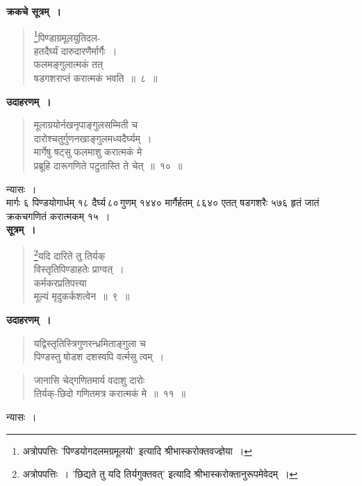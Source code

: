 \documentclass[11pt, openany]{book}
\begin{document}
\textbf{क्रकचे सूत्रम्~।}
\begin{quote}
{\gk \renewcommand{\thefootnote}{१}\footnote{अत्रोपपत्तिः
{\qt 'पिण्डयोगदलमग्रमूलयो'} इत्यादि {\qt श्रीभास्करो}क्तवज्ज्ञेया~।}पिण्डाग्रमूलयुतिदल-\\
हतदैर्घ्यं दारुदारणैर्मार्गैः~।\\
फलमङ्गुलात्मकं तत्\\
षडगशराप्तं करात्मकं भवति~॥~८~॥}
\end{quote}

\newpage

\textbf{उदाहरणम्~।}

\begin{quote}
{\ex मूलाग्रयोर्नखनृपाङ्गुलसम्मिती च\\
दारोश्चतुर्गुणनखाङ्गुलमध्यदैर्घ्यम्~।\\
मार्गेषु षट्सु फलमाशु करात्मकं मे\\
प्रब्रूहि दारूगणिते पटुतास्ति ते चेत्~॥~१०~॥}
\end{quote}

न्यासः~।\\

मार्गः ६ पिण्डयोगार्धम् १८ दैर्घ्य\textendash \,८०\textendash \,गुणम् १४४० मार्गैर्हतम् ८६४० एतत् षडगशरैः ५७६ हृतं जातं क्रकचगणितं करात्मकम् १५~।\\

\textbf{सूत्रम्~।}
\begin{quote}
{\gk \renewcommand{\thefootnote}{१}\footnote{अत्रोपपत्तिः~। {\qt 'छिद्यते तु यदि तिर्यगुक्तवत्'} इत्यादि {\qt श्रीभास्करो}क्तानुरूपमेवेदम्~।}यदि दारिते तु तिर्यक्\\
विस्तृतिपिण्डाहतेः प्राग्वत्~।\\
कर्मकरप्रतिपत्त्या\\
मूल्यं मृदुकर्कशत्वेन~॥~९~॥}
\end{quote}

\textbf{उदाहरणम्~।}

\begin{quote}
{\ex यद्विस्तृतिस्त्रिगुणरन्ध्रमिताङ्गुला च\\
पिण्डस्तु षोडश दशस्वपि वर्त्मसु त्वम्~।}
\end{quote}

\newpage

\begin{quote}
{\ex जानासि चेद्गणितमार्य वदाशु दारोः\\
	तिर्यक्-छिदो गणितमत्र करात्मकं मे~॥~११~॥}	
\end{quote}

न्यासः~।\\
\vspace{-3mm}
\end{document}
